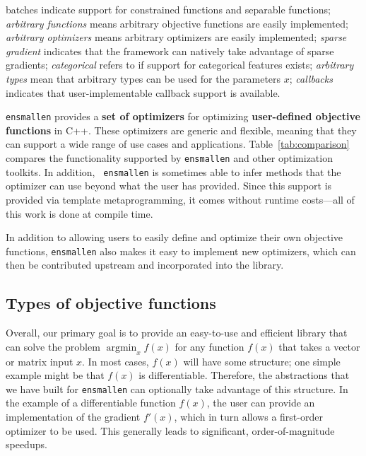 \begin{table}[t!]
{{batches} indicate support for constrained functions and separable functions;
{\it arbitrary functions} means arbitrary objective functions are easily
implemented; {\it arbitrary optimizers} means arbitrary optimizers are easily
implemented; {\it sparse gradient} indicates that the framework can natively
take advantage of sparse gradients; {\it categorical} refers to if support
for categorical features exists; {\it arbitrary types} mean that arbitrary types
can be used for the parameters $x$;
{\it callbacks} indicates that user-implementable callback support is available.
}
\label{tab:comparison}
\end{table}

{\tt ensmallen} provides a {\bf set of optimizers} for optimizing {\bf
user-defined objective functions} in C++.  These optimizers are generic and
flexible, meaning that they can support a wide range of use cases and
applications.  Table~\ref{tab:comparison} compares the functionality supported
by {\tt ensmallen} and other optimization toolkits.  In addition, {\tt
ensmallen} is sometimes able to infer methods that the optimizer can use beyond
what the user has provided.  Since this support is provided via template
metaprogramming, it comes without runtime costs---all of this work is done at
compile time.

In addition to allowing users to easily define and optimize their own objective
functions, {\tt ensmallen} also makes it easy to implement new optimizers, which
can then be contributed upstream and incorporated into the library.

\subsection{Types of objective functions}

Overall, our primary goal is to provide an easy-to-use and efficient library
that can solve the problem $\operatorname{argmin}_x f(x)$ for any function
$f(x)$ that takes a vector or matrix input $x$.  In most cases, $f(x)$ will have
some structure; one simple example might be that $f(x)$ is differentiable.
Therefore, the abstractions that we have built for {\tt ensmallen} can
optionally take advantage of this structure.  In the example of a differentiable
function $f(x)$, the user can provide an implementation of the gradient $f'(x)$,
which in turn allows a first-order optimizer to be used.  This generally leads
to significant, order-of-magnitude speedups.

